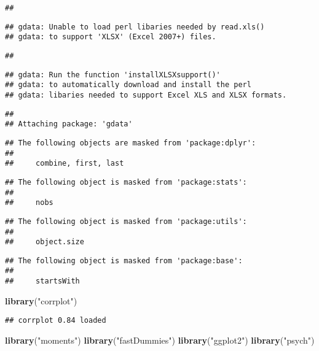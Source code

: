 \documentclass[
]{article}
\newenvironment{Shaded}{\begin{snugshade}}{\end{snugshade}}
\newcommand{\KeywordTok}[1]{\textcolor[rgb]{0.13,0.29,0.53}{\textbf{#1}}}
\newcommand{\NormalTok}[1]{#1}
\newcommand{\StringTok}[1]{\textcolor[rgb]{0.31,0.60,0.02}{#1}}
\begin{document}
\begin{verbatim}
## 
\end{verbatim}

\begin{verbatim}
## gdata: Unable to load perl libaries needed by read.xls()
## gdata: to support 'XLSX' (Excel 2007+) files.
\end{verbatim}

\begin{verbatim}
## 
\end{verbatim}

\begin{verbatim}
## gdata: Run the function 'installXLSXsupport()'
## gdata: to automatically download and install the perl
## gdata: libaries needed to support Excel XLS and XLSX formats.
\end{verbatim}

\begin{verbatim}
## 
## Attaching package: 'gdata'
\end{verbatim}

\begin{verbatim}
## The following objects are masked from 'package:dplyr':
## 
##     combine, first, last
\end{verbatim}

\begin{verbatim}
## The following object is masked from 'package:stats':
## 
##     nobs
\end{verbatim}

\begin{verbatim}
## The following object is masked from 'package:utils':
## 
##     object.size
\end{verbatim}

\begin{verbatim}
## The following object is masked from 'package:base':
## 
##     startsWith
\end{verbatim}

\begin{Shaded}
\begin{Highlighting}[]
\KeywordTok{library}\NormalTok{(}\StringTok{"corrplot"}\NormalTok{)}
\end{Highlighting}
\end{Shaded}

\begin{verbatim}
## corrplot 0.84 loaded
\end{verbatim}

\begin{Shaded}
\begin{Highlighting}[]
\KeywordTok{library}\NormalTok{(}\StringTok{"moments"}\NormalTok{)}
\KeywordTok{library}\NormalTok{(}\StringTok{"fastDummies"}\NormalTok{)}
\KeywordTok{library}\NormalTok{(}\StringTok{"ggplot2"}\NormalTok{)}
\KeywordTok{library}\NormalTok{(}\StringTok{"psych"}\NormalTok{)}
\end{Highlighting}
\end{Shaded}
\end{document}

